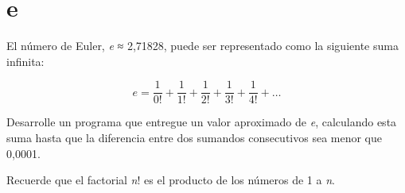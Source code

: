 \section{e}

El número de Euler, \emph{e} ≈ 2,71828, puede ser representado como la
siguiente suma infinita:

\[e = \frac{1}{0!} +  \frac{1}{1!} +  \frac{1}{2!} +  \frac{1}{3!} +  \frac{1}{4!} + \ldots\]

Desarrolle un programa que entregue un valor aproximado de \emph{e},
calculando esta suma hasta que la diferencia entre dos sumandos
consecutivos sea menor que 0,0001.

Recuerde que el factorial \emph{n}! es el producto de los números de 1 a
\emph{n}.

